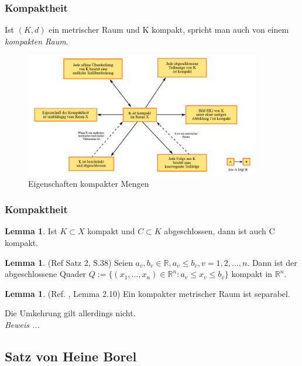 \documentclass[t, handout]{beamer}
\newcommand{\R}{\mathbb{R}}
\theoremstyle{definition} %
\newtheorem{lem}[sa]{Lemma}
\begin{document}
\begin{frame}
\frametitle{Kompaktheit}
Ist $(K,d)$ ein metrischer Raum und K kompakt, spricht man auch von einem \textit{kompakten Raum}.
\begin{figure}
\includegraphics[width=0.92\textwidth]{pictures/kompaktheit.png}
\caption{Eigenschaften kompakter Mengen \cite{KompakterRaum}}
\end{figure}
\end{frame}

\begin{frame}
\frametitle{Kompaktheit}
\begin{lem}
Ist $K \subset X$ kompakt und $C \subset K$ abgeschlossen, dann ist auch C kompakt.
\end{lem}
\pause
\begin{lem}
(Ref \cite{Forster} Satz 2, S.38) Seien $a_v, b_v \in \R, a_v \leq b_v , v = 1, 2, . . . , n$. Dann ist der abgeschlossene Quader
$Q := \{(x_1, . . . , x_n) \in  \R^n : a_v \leq x_v \leq b_v \}$ kompakt in $\R^n$.


\end{lem}
\pause
\begin{lem}
(Ref. \cite{Clason}, Lemma 2.10) Ein kompakter metrischer Raum ist separabel.
\end{lem}
\pause
Die Umkehrung gilt allerdings nicht.\\
\textit{Beweis ...}
\end{frame}

\subsection{Satz von Heine Borel}
\end{document}
